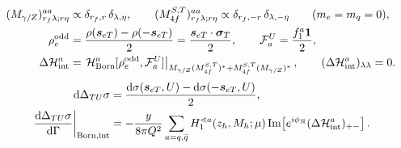 \documentclass[a4paper,11pt]{article}
\begin{document}
\begin{equation}
    \begin{aligned}
        (M_{\gamma/Z})^{aa}_{r_f\lambda;r\eta}
        &\propto\delta_{r_f,r}\,\delta_{\lambda,\eta},\qquad
        (M_{4f}^{S,T})^{aa}_{r_f\lambda;r\eta}
        \propto\delta_{r_f,-r}\,\delta_{\lambda,-\eta}
        \qquad(m_e=m_q=0),\\
        \rho_e^{\rm odd}
        &=\frac{\rho(\bm s_{eT})-\rho(-\bm s_{eT})}{2}
         =\frac{\bm s_{eT}\cdot\bm\sigma_T}{2},\qquad
        {\cal F}_a^{U}=\frac{f_1^a\mathbf 1}{2},\\
        \Delta {\cal H}^{a}_{\rm int}
        &=\left.{\cal H}^{a}_{\rm Born}[\rho_e^{\rm odd},{\cal F}_a^{U}]
                      \right|_{M_{\gamma/Z}(M_{4f}^{S,T})^*+
                               M_{4f}^{S,T}(M_{\gamma/Z})^*},\qquad
        (\Delta{\cal H}^{a}_{\rm int})_{\lambda\lambda}=0 .
    \end{aligned}
    \label{eq:sidis-beam-spin-interference}
\end{equation}
\begin{equation}
    \begin{aligned}
        \dd\Delta_{TU}\sigma
        &=\frac{\dd\sigma(\bm s_{eT},U)-\dd\sigma(-\bm s_{eT},U)}{2},\\
        \left.\frac{\dd\Delta_{TU}\sigma}{\dd\Gamma}\right|_{\rm Born,int}
        &=-\frac{y}{8\pi Q^2}\sum_{a=q,\bar q}H_1^{\sphericalangle a}(z_h,M_h;\mu)
           \operatorname{Im}\!\left[e^{i\phi_R}
                                    (\Delta{\cal H}^{a}_{\rm int})_{+-}\right].
    \end{aligned}
    \label{eq:sidis-beam-spin-cross-section}
\end{equation}
\end{document}
